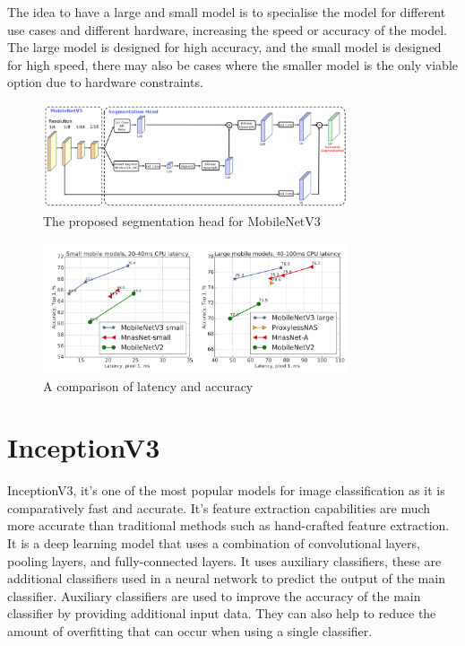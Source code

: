 \documentclass[]{final_report}
\begin{document}
The idea to have a large and small model is to specialise the model for different use cases and different hardware, increasing the speed or accuracy of the model.
The large model is designed for high accuracy, and the small model is designed for high speed, there may also be cases where the smaller model is the only viable option due to hardware constraints.

\begin{figure}[ht!]
  \centering
  \includegraphics[width=0.8\textwidth]{images/MobileNetv3-structure.png}
  \caption{The proposed segmentation head for MobileNetV3\cite{DBLP:journals/corr/abs-1905-02244}}
  \label{fig:mobilenetv3-segmentation}
\end{figure}

\begin{figure}[ht!]
  \centering
  \includegraphics[width=0.8\textwidth]{images/mobilenet-comparison.png}
  \caption{A comparison of latency and accuracy\cite{DBLP:journals/corr/abs-1905-02244}}
  \label{fig:mobilenetv3-comparison}
\end{figure}



\section{InceptionV3}
InceptionV3\cite{DBLP:journals/corr/SzegedyVISW15}, it's one of the most popular models for image classification as it is comparatively fast and accurate.
It's feature extraction capabilities are much more accurate than traditional methods such as hand-crafted feature extraction.
It is a deep learning model that uses a combination of convolutional layers, pooling layers, and fully-connected layers.
It uses auxiliary classifiers, these are additional classifiers used in a neural network to predict the output of the main classifier. Auxiliary classifiers are used to improve the accuracy of the main classifier by providing additional input data.
They can also help to reduce the amount of overfitting that can occur when using a single classifier.
\end{document}
